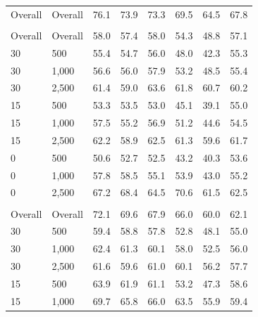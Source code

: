\documentclass[twoside,11pt]{article}\usepackage[]{graphicx}\usepackage[]{xcolor}
\newenvironment{knitrout}{}{} %
\begin{document}
\begin{knitrout}
\begin{landscape}
\begin{longtable}[t]{llcccccc}
\endfoot
\bottomrule
\endlastfoot
Overall & Overall & 76.1 & 73.9 & 73.3 & 69.5 & 64.5 & 67.8\\
\addlinespace[0.3em]
\multicolumn{8}{l}{\textit{\textbf{Interactions}}}\\
\hline
\hspace{1em}Overall & Overall & 58.0 & 57.4 & 58.0 & 54.3 & 48.8 & 57.1\\
\hspace{1em}30 & 500 & 55.4 & 54.7 & 56.0 & 48.0 & 42.3 & 55.3\\
\hspace{1em}30 & 1,000 & 56.6 & 56.0 & 57.9 & 53.2 & 48.5 & 55.4\\
\hspace{1em}30 & 2,500 & 61.4 & 59.0 & 63.6 & 61.8 & 60.7 & 60.2\\
\hspace{1em}15 & 500 & 53.3 & 53.5 & 53.0 & 45.1 & 39.1 & 55.0\\
\hspace{1em}15 & 1,000 & 57.5 & 55.2 & 56.9 & 51.2 & 44.6 & 54.5\\
\hspace{1em}15 & 2,500 & 62.2 & 58.9 & 62.5 & 61.3 & 59.6 & 61.7\\
\hspace{1em}0 & 500 & 50.6 & 52.7 & 52.5 & 43.2 & 40.3 & 53.6\\
\hspace{1em}0 & 1,000 & 57.8 & 58.5 & 55.1 & 53.9 & 43.0 & 55.2\\
\hspace{1em}0 & 2,500 & 67.2 & 68.4 & 64.5 & 70.6 & 61.5 & 62.5\\
\addlinespace[0.3em]
\multicolumn{8}{l}{\textit{\textbf{Non-linear effects}}}\\
\hline
\hspace{1em}Overall & Overall & 72.1 & 69.6 & 67.9 & 66.0 & 60.0 & 62.1\\
\hspace{1em}30 & 500 & 59.4 & 58.8 & 57.8 & 52.8 & 48.1 & 55.0\\
\hspace{1em}30 & 1,000 & 62.4 & 61.3 & 60.1 & 58.0 & 52.5 & 56.0\\
\hspace{1em}30 & 2,500 & 61.6 & 59.6 & 61.0 & 60.1 & 56.2 & 57.7\\
\hspace{1em}15 & 500 & 63.9 & 61.9 & 61.1 & 53.2 & 47.3 & 58.6\\
\hspace{1em}15 & 1,000 & 69.7 & 65.8 & 66.0 & 63.5 & 55.9 & 59.4\\

\end{longtable}
\end{landscape}
\end{knitrout}
\end{document}
